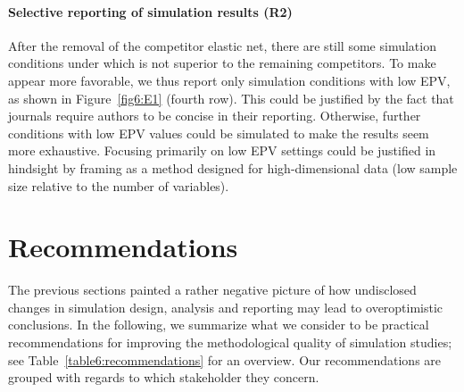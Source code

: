 \paragraph{Selective reporting of simulation results (R2)}
After the removal of the competitor elastic net, there are still some simulation
conditions under which \ainet{} is not superior to the remaining competitors. To
make \ainet{} appear more favorable, we thus report only simulation conditions
with low EPV, as shown in Figure~\ref{fig6:E1} (fourth row). This could be
justified by the fact that journals require authors to be concise in their
reporting. Otherwise, further conditions with low EPV values could be simulated
to make the results seem more exhaustive. Focusing primarily on low EPV settings
could be justified in hindsight by framing \ainet{} as a method designed for
high-dimensional data (low sample size relative to the number of variables).

\section{Recommendations}
\label{sec6:recommendations}

The previous sections painted a rather negative picture of how
undisclosed changes in simulation design, analysis and reporting
may lead to overoptimistic conclusions. In the
following, we summarize what we consider to be practical recommendations for
improving the methodological quality of simulation studies; see
Table~\ref{table6:recommendations} for an overview. Our recommendations are
grouped with regards to which stakeholder they concern.

